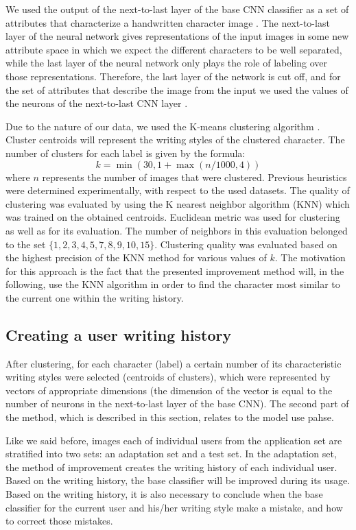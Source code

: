 \documentclass{article}
\begin{document}
We used the output of the next-to-last layer of the base CNN classifier as a set of attributes that characterize a handwritten character image \citet{nexttolast}.
The next-to-last layer of the neural network gives representations of the input images in some new attribute space in which we expect the different characters to be well separated,
while the last layer of the neural network only plays the role of labeling over those representations.
Therefore, the last layer of the network is cut off, and for the set of attributes that describe the image from the input we used the values of the neurons of the next-to-last CNN layer \citet{style1} \citet{style2}.

Due to the nature of our data, we used the K-means clustering algorithm \citet{kmeans}.
Cluster centroids will represent the writing styles of the clustered character.
The number of clusters for each label is given by the formula:
\begin{equation}
  k = \min(30, 1+\max(n/1000, 4))
\end{equation}
where $n$ represents the number of images that were clustered.
Previous heuristics were determined experimentally, with respect to the used datasets.
The quality of clustering was evaluated by using the K nearest neighbor algorithm (KNN) which was trained on the obtained centroids.
Euclidean metric was used for clustering as well as for its evaluation.
The number of neighbors in this evaluation belonged to the set $\{1,2,3,4,5,7,8,9,10,15\}$.
Clustering quality was evaluated based on the highest precision of the KNN method for various values of $k$.
The motivation for this approach is the fact that the presented improvement method will, in the following, use the KNN algorithm in order to find the character most similar to the current one within the writing history.

\subsection{Creating a user writing history}

After clustering, for each character (label) a certain number of its characteristic writing styles were selected (centroids of clusters), which were represented by vectors of appropriate dimensions
(the dimension of the vector is equal to the number of neurons in the next-to-last layer of the base CNN).
The second part of the method, which is described in this section, relates to the model use pahse.

Like we said before, images each of individual users from the application set are stratified into two sets: an adaptation set and a test set. %
In the adaptation set, the method of improvement creates the writing history of each individual user.
Based on the writing history, the base classifier will be improved during its usage.
Based on the writing history, it is also necessary to conclude when the base classifier for the current user and his/her writing style make a mistake, and how to correct those mistakes.
\end{document}
